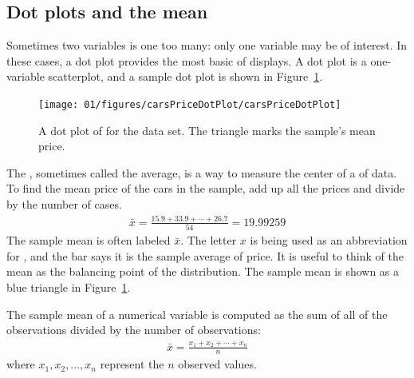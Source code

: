 \subsection{Dot plots and the mean}
\label{dotPlot}

Sometimes two variables is one too many: only one variable may be of interest. In these cases, a dot plot provides the most basic of displays. A dot plot is a one-variable scatterplot, and a sample dot plot is shown in Figure~\ref{carsPriceDotPlot}.
\begin{figure}[h]
   \centering
   \texttt{[image: 01/figures/carsPriceDotPlot/carsPriceDotPlot]}
   \caption{A dot plot of  for the  data set. The triangle marks the sample's mean price.}
   \label{carsPriceDotPlot}
\end{figure}

The , sometimes called the average, is a way to measure the center of a  of data. To find the mean price of the cars in the sample, add up all the prices and divide by the number of cases.
\begin{eqnarray}
\bar{x} = \frac{15.9 + 33.9 + \cdots + 26.7}{54} = 19.99259
\label{sampleMeanEquation}
\end{eqnarray}
The sample mean is often labeled $\bar{x}$. The letter $x$ is being used as an abbreviation for , and the bar says it is the sample average of price. It is useful to think of the mean as the balancing point of the distribution. The sample mean is shown as a blue triangle in Figure~\ref{carsPriceDotPlot}.

\begin{termBox}{
The sample mean of a numerical variable is computed as the sum of all of the observations divided by the number of observations:
\begin{eqnarray}
\bar{x} = \frac{x_1+x_2+\cdots+x_n}{n}
\label{meanEquation}
\end{eqnarray}
where $x_1, x_2, \dots, x_n$ represent the $n$ observed values.}
\end{termBox}\vspace{-2mm}

